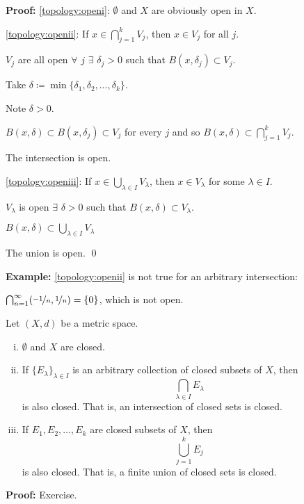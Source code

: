 \documentclass[10pt,aspectratio=169]{beamer}
\begin{document}
\begin{frame}

\textbf{Proof:}
\eqref{topology:openi}:
$\emptyset$ and $X$ are obviously open in $X$.

\pause
\medskip

\eqref{topology:openii}:
If $x \in \bigcap_{j=1}^k V_j$, then $x \in V_j$ for all $j$.

\pause
$V_j$ are all open
\pause
\wthus $\forall$ $j$ $\exists$ $\delta_j > 0$ 
such that $B(x,\delta_j) \subset V_j$.

\pause
Take $\delta \coloneqq \min \{ \delta_1,\delta_2,\ldots,\delta_k \}$.

\pause
Note $\delta > 0$.

\pause
\thus \quad $B(x,\delta) \subset B(x,\delta_j) \subset V_j$ for every $j$ and so
$B(x,\delta) \subset \bigcap_{j=1}^k V_j$.

\pause
\thus \quad The intersection is open.

\pause
\medskip

\eqref{topology:openiii}:
If $x \in \bigcup_{\lambda \in I} V_\lambda$, then $x \in V_\lambda$ for some
$\lambda \in I$.


\pause
$V_\lambda$ is open
\pause
\wthus $\exists$ $\delta > 0$
such that $B(x,\delta) \subset V_\lambda$.

\pause
\thus \quad
$B(x,\delta) \subset \bigcup_{\lambda \in I} V_\lambda$

\pause
\thus \quad The union is open.
\qed

\pause
\medskip

\textbf{Example:}
\eqref{topology:openii} is not true for an arbitrary intersection:

\pause
$\bigcap_{n=1}^\infty (\nicefrac{-1}{n},\nicefrac{1}{n}) = \{ 0 \}$,
which is not open.

\end{frame}

\begin{frame}
\begin{proposition}
Let $(X,d)$ be a metric space.
\begin{enumerate}[(i)]
\item
\pause
\label{topology:closedi} $\emptyset$ and $X$ are closed.
\item
\pause
\label{topology:closedii} If $\{ E_\lambda \}_{\lambda \in I}$ is
an arbitrary collection of closed subsets of $X$, then
\begin{equation*}
\bigcap_{\lambda \in I} E_\lambda
\end{equation*}
is also closed.  That is, an intersection of closed sets is closed.
\item
\pause
\label{topology:closediii} If $E_1, E_2, \ldots, E_k$ are closed
subsets of $X$, then
\begin{equation*}
\bigcup_{j=1}^k E_j
\end{equation*}
is also closed.  That is, a finite union of closed sets is closed.
\end{enumerate}
\end{proposition}

\pause
\textbf{Proof:} Exercise.

\end{frame}
\end{document}
